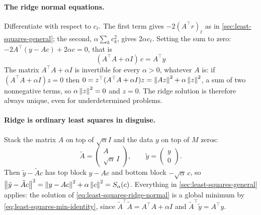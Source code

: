 \paragraph{The ridge normal equations.} Differentiate with respect to $c_\ell$. The first term gives $-2(A^\top r)_\ell$ as in \cref{sec:least-squares-general}; the second, $\alpha\sum_k c_k^2$, gives $2\alpha c_\ell$. Setting the sum to zero: $-2A^\top(y - Ac) + 2\alpha c = 0$, that is
\begin{equation}
\boxed{\,(A^\top A + \alpha I)\,c = A^\top y\,}
\label{eq:least-squares-ridge-normal}
\end{equation}
The matrix $A^\top A + \alpha I$ is invertible for every $\alpha>0$, whatever $A$ is: if $(A^\top A+\alpha I)z = 0$ then $0 = z^\top(A^\top A+\alpha I)z = \left\lVert Az\right\rVert^2 + \alpha\left\lVert z\right\rVert^2$, a sum of two nonnegative terms, so $\alpha\left\lVert z\right\rVert^2 = 0$ and $z = 0$. The ridge solution is therefore always unique, even for underdetermined problems.

\paragraph{Ridge is ordinary least squares in disguise.} Stack the matrix $A$ on top of $\sqrt\alpha I$ and the data $y$ on top of $M$ zeros:
\[
\tilde A = \begin{pmatrix} A \\ \sqrt\alpha\, I\end{pmatrix},\qquad \tilde y = \begin{pmatrix} y\\ 0\end{pmatrix}.
\]
Then $\tilde y - \tilde A c$ has top block $y - Ac$ and bottom block $-\sqrt\alpha\, c$, so $\left\lVert \tilde y - \tilde Ac\right\rVert^2 = \left\lVert y-Ac\right\rVert^2 + \alpha\left\lVert c\right\rVert^2 = S_\alpha(c)$. Everything in \cref{sec:least-squares-general} applies: the solution of \cref{eq:least-squares-ridge-normal} is a global minimum by \cref{eq:least-squares-min-identity}, since $\tilde A^\top\tilde A = A^\top A + \alpha I$ and $\tilde A^\top\tilde y = A^\top y$.

